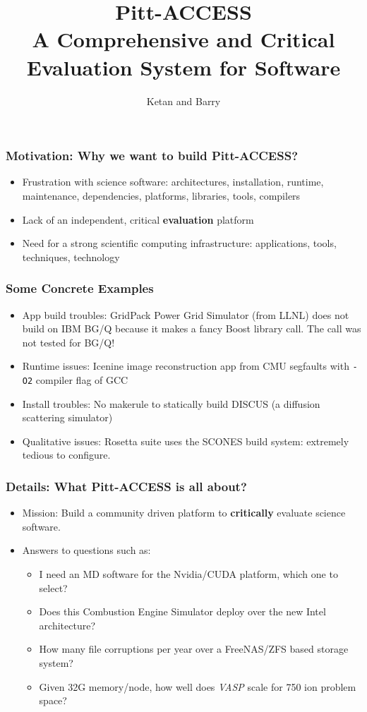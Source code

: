 \documentclass[hyperref={pdfpagelabels=false},12pt]{beamer}
\title[Pitt Access]{{\large Pitt-ACCESS\\ A Comprehensive and Critical Evaluation System for Software}}
\author[Pitt-Access]{{Ketan and Barry}}
\date{}
\begin{document}
\begin{frame}[plain]
\titlepage
\end{frame}

\begin{frame}
\frametitle{Motivation: Why we want to build Pitt-ACCESS?}
\begin{itemize}
\itemsep1em
\item 
Frustration with science software: architectures, installation, runtime, maintenance, dependencies, platforms, libraries, tools, compilers
\item 
Lack of an independent, critical \textbf{evaluation} platform
\item 
Need for a strong scientific computing infrastructure: applications, tools, techniques, technology
\end{itemize}
\end{frame}

\begin{frame}
\frametitle{Some Concrete Examples}
\begin{itemize}
\itemsep1em
\item App build troubles: GridPack Power Grid Simulator (from LLNL) does not build on IBM BG/Q because it makes a fancy Boost library call. The call was not tested for BG/Q!
\item Runtime issues: Icenine image reconstruction app from CMU segfaults with \texttt{-O2} compiler flag of GCC
\item Install troubles: No makerule to statically build DISCUS (a diffusion scattering simulator)
\item Qualitative issues: Rosetta suite uses the SCONES build system: extremely tedious to configure.
\end{itemize}
\end{frame}

\begin{frame}
\frametitle{Details: What Pitt-ACCESS is all about?}
\begin{itemize}
\itemsep1em
\item 
Mission: Build a community driven platform to \textbf{critically} evaluate science software.
\item 
Answers to questions such as:
\begin{itemize}
\item 
I need an MD software for the Nvidia/CUDA platform, which one to select?
\item 
Does this Combustion Engine Simulator deploy over the new Intel architecture?
\item
How many file corruptions per year over a FreeNAS/ZFS based storage system?
\item 
Given 32G memory/node, how well does \textit{VASP} scale for 750 ion problem space?
\end{itemize}
\end{itemize}

\end{frame}
\end{document}
